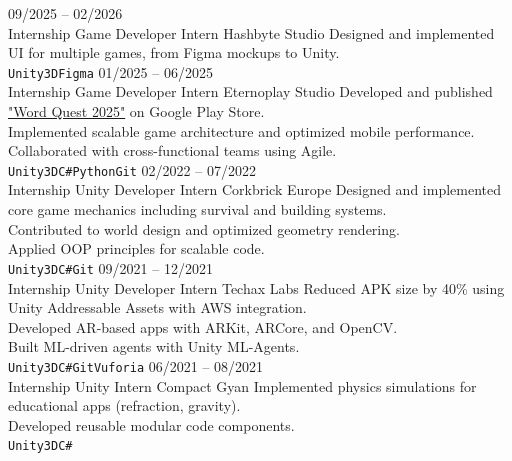 \documentclass[9pt]{developercv}
\begin{document}
	\begin{entrylist}
		\entry
		{09/2025 -- 02/2026\\\footnotesize{Internship}}
		{Game Developer Intern}
		{Hashbyte Studio}
		{
			Designed and implemented UI for multiple games, from Figma mockups to Unity.\\
			\texttt{Unity3D}\slashsep\texttt{Figma}
		}
		\entry
		{01/2025 -- 06/2025\\\footnotesize{Internship}}
		{Game Developer Intern}
		{Eternoplay Studio}
		{
			Developed and published \href{https://play.google.com/store/apps/details?id=com.ep.wordquest}{"Word Quest 2025"} on Google Play Store.\\
			Implemented scalable game architecture and optimized mobile performance.\\
			Collaborated with cross-functional teams using Agile.\\
			\texttt{Unity3D}\slashsep\texttt{C\#}\slashsep\texttt{Python}\slashsep\texttt{Git}
		}
		\entry
		{02/2022 -- 07/2022\\\footnotesize{Internship}}
		{Unity Developer Intern}
		{Corkbrick Europe}
		{
			Designed and implemented core game mechanics including survival and building systems.\\
			Contributed to world design and optimized geometry rendering.\\
			Applied OOP principles for scalable code.\\
			\texttt{Unity3D}\slashsep\texttt{C\#}\slashsep\texttt{Git}
		}
		\entry
		{09/2021 -- 12/2021\\\footnotesize{Internship}}
		{Unity Developer Intern}
		{Techax Labs}
		{
			Reduced APK size by 40\% using Unity Addressable Assets with AWS integration.\\
			Developed AR-based apps with ARKit, ARCore, and OpenCV.\\
			Built ML-driven agents with Unity ML-Agents.\\
			\texttt{Unity3D}\slashsep\texttt{C\#}\slashsep\texttt{Git}\slashsep\texttt{Vuforia}
		}
		\entry
		{06/2021 -- 08/2021\\\footnotesize{Internship}}
		{Unity Intern}
		{Compact Gyan}
		{
			Implemented physics simulations for educational apps (refraction, gravity).\\
			Developed reusable modular code components.\\
			\texttt{Unity3D}\slashsep\texttt{C\#}
		}
	\end{entrylist}
	
	
\end{document}
